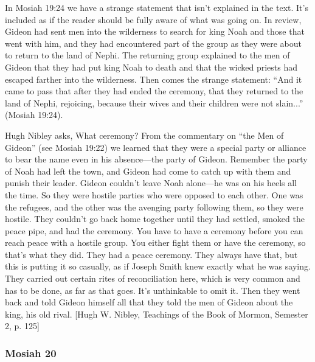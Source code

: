 \begin{compactdesc}
\begin{compactdesc}
\begin{compactitem}
		\item In Mosiah 19:24 we have a strange statement that isn't explained in the text. It's included as if the reader should be fully aware of what was going on. In review, Gideon had sent men into the wilderness to search for king Noah and those that went with him, and they had encountered part of the group as they were about to return to the land of Nephi. The returning group explained to the men of Gideon that they had put king Noah to death and that the wicked priests had escaped farther into the wilderness. Then comes the strange statement: ``And it came to pass that after they had ended the ceremony, that they returned to the land of Nephi, rejoicing, because their wives and their children were not slain...'' (Mosiah 19:24).

		Hugh Nibley asks, What ceremony? From the commentary on ``the Men of Gideon'' (see Mosiah 19:22) we learned that they were a special party or alliance to bear the name even in his absence---the party of Gideon. Remember the party of Noah had left the town, and Gideon had come to catch up with them and punish their leader. Gideon couldn't leave Noah alone---he was on his heels all the time. So they were hostile parties who were opposed to each other. One was the refugees, and the other was the avenging party following them, so they were hostile. They couldn't go back home together until they had settled, smoked the peace pipe, and had the ceremony. You have to have a ceremony before you can reach peace with a hostile group. You either fight them or have the ceremony, so that's what they did. They had a peace ceremony. They always have that, but this is putting it so casually, as if Joseph Smith knew exactly what he was saying. They carried out certain rites of reconciliation here, which is very common and has to be done, as far as that goes. It's unthinkable to omit it. Then they went back and told Gideon himself all that they told the men of Gideon about the king, his old rival. [Hugh W. Nibley, Teachings of the Book of Mormon, Semester 2, p. 125]
		\end{compactitem}

		\end{compactdesc}

		\end{compactdesc}

	\subsubsection{Mosiah 20} %

